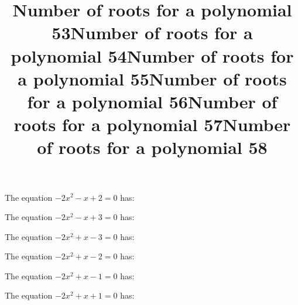 \documentclass{article}
\begin{document}
\begin{category}
\begin{question}[multichoice]

\end{question}
\begin{question}[multichoice]
\title{Number of roots for a polynomial 53}
The equation $- 2 x^{2} - x + 2=0$ has:


\end{question}
\begin{question}[multichoice]
\title{Number of roots for a polynomial 54}
The equation $- 2 x^{2} - x + 3=0$ has:


\end{question}
\begin{question}[multichoice]
\title{Number of roots for a polynomial 55}
The equation $- 2 x^{2} + x - 3=0$ has:


\end{question}
\begin{question}[multichoice]
\title{Number of roots for a polynomial 56}
The equation $- 2 x^{2} + x - 2=0$ has:


\end{question}
\begin{question}[multichoice]
\title{Number of roots for a polynomial 57}
The equation $- 2 x^{2} + x - 1=0$ has:


\end{question}
\begin{question}[multichoice]
\title{Number of roots for a polynomial 58}
The equation $- 2 x^{2} + x + 1=0$ has:



\end{question}
\end{category}
\end{document}
